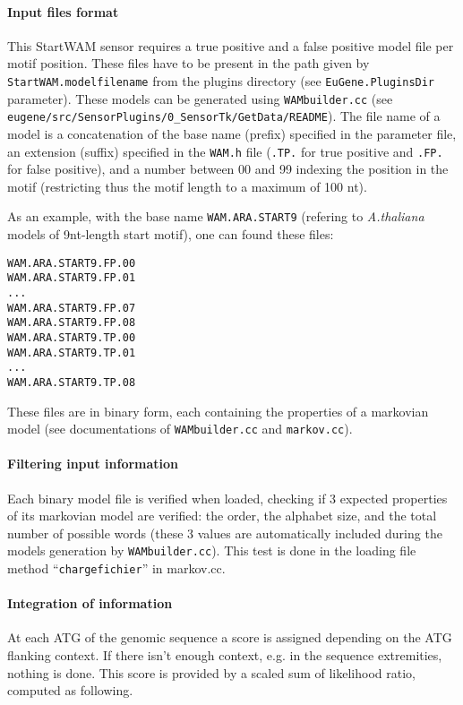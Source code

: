 \paragraph{Input files format}

This StartWAM sensor requires a true positive and a false positive
model file per motif position. These files have to be present in the
path given by \texttt{StartWAM.modelfilename} from the plugins
directory (see \texttt{EuGene.PluginsDir} parameter). These models can
be generated using \texttt{WAMbuilder.cc} (see
\texttt{eugene/src/SensorPlugins/0\_SensorTk/GetData/README}).  The
file name of a model is a concatenation of the base name (prefix)
specified in the parameter file, an extension (suffix) specified in
the \texttt{WAM.h} file (\texttt{.TP.} for true positive and
\texttt{.FP.}  for false positive), and a number between 00 and 99
indexing the position in the motif (restricting thus the motif length
to a maximum of 100 nt).

As an example, with the base name \texttt{WAM.ARA.START9} (refering to
{\em A.thaliana} models of 9nt-length start motif), one can found these files:
\begin{Verbatim}[fontsize=\small]
WAM.ARA.START9.FP.00
WAM.ARA.START9.FP.01
...
WAM.ARA.START9.FP.07
WAM.ARA.START9.FP.08
WAM.ARA.START9.TP.00
WAM.ARA.START9.TP.01
...
WAM.ARA.START9.TP.08
\end{Verbatim}

These files are in binary form, each containing the properties of a
markovian model (see documentations of \texttt{WAMbuilder.cc} and
\texttt{markov.cc}).

\paragraph{Filtering input information}

Each binary model file is verified when loaded, checking if 3 expected
properties of its markovian model are verified: the order, the
alphabet size, and the total number of possible words (these 3 values
are automatically included during the models generation by
\texttt{WAMbuilder.cc}). This test is done in the loading file method
``\texttt{chargefichier}'' in markov.cc.

\paragraph{Integration of information}

At each ATG of the genomic sequence a score is assigned depending on
the ATG flanking context. If there isn't enough context, e.g. in the
sequence extremities, nothing is done.  This score is provided by a
scaled sum of likelihood ratio, computed as following.

